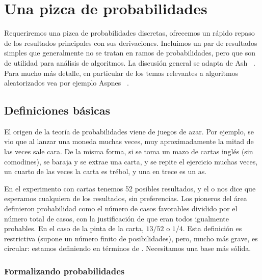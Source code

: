 

\chapter{Una pizca de probabilidades}
\label{apx:pizca-probabilidades}

  Requeriremos una pizca de probabilidades discretas,
  ofrecemos un rápido repaso de los resultados principales
  con sus derivaciones.
  Incluimos un par de resultados simples que generalmente no se tratan
  en ramos de probabilidades,
  pero que son de utilidad para análisis de algoritmos.
  La discusión general se adapta de Ash~%
    \cite{ash08:_basic_probab_theo}.
  Para mucho más detalle,
  en particular de los temas relevantes a algoritmos aleatorizados
  vea por ejemplo Aspnes~%
    \cite{aspnes20:_notes_randomized_algorithms}.

\section{Definiciones básicas}
\label{sec:definiciones-probabilidades}

  El origen de la teoría de probabilidades viene de juegos de azar.
  Por ejemplo,
  se vio que al lanzar una moneda muchas veces,
  muy aproximadamente la mitad de las veces sale cara.
  De la misma forma,
  si se toma un mazo de cartas inglés
  (sin comodines),
  se baraja y se extrae una carta,
  y se repite el ejercicio muchas veces,
  un cuarto de las veces la carta es trébol,
  y una en trece es un as.

  En el experimento con cartas tenemos \num{52} posibles resultados,
  y el  o 
  nos dice que esperamos cualquiera de los resultados,
  sin preferencias.
  Los pioneros del área definieron probabilidad
  como el número de casos favorables dividido por el número total de casos,
  con la justificación de que eran todos igualmente probables.
  En el caso de la pinta de la carta,
   \(13 / 52\) o \(1 / 4\).
  Esta definición es restrictiva
  (supone un número finito de posibilidades),
  pero,
  mucho más grave,
  es circular:
  estamos definiendo 
  en términos de .
  Necesitamos una base más sólida.

\subsection{Formalizando probabilidades}
\label{sec:formalizar-probabilidad}

